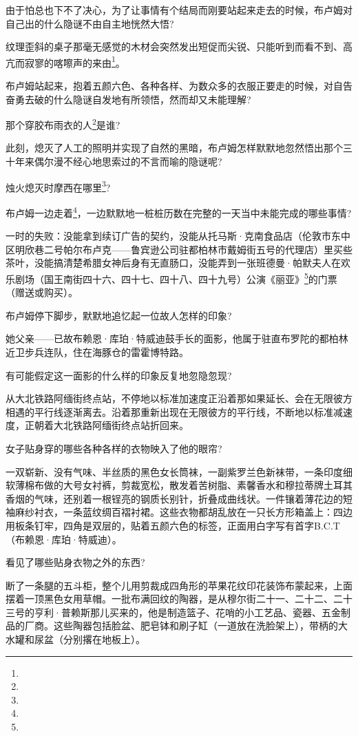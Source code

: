 \par 由于怕总也下不了决心，为了让事情有个结局而刚要站起来走去的时候，布卢姆对自己出的什么隐谜不由自主地恍然大悟?
\par 纹理歪斜的桌子那毫无感觉的木材会突然发出短促而尖锐、只能听到而看不到、高亢而寂寥的喀嚓声的来由\footnote{}。
\par 布卢姆站起来，抱着五颜六色、各种各样、为数众多的衣服正要走的时候，对自告奋勇去破的什么隐谜自发地有所领悟，然而却又未能理解?
\par 那个穿胶布雨衣的人\footnote{}是谁?
\par 此刻，熄灭了人工的照明并实现了自然的黑暗，布卢姆怎样默默地忽然悟出那个三十年来偶尔漫不经心地思索过的不言而喻的隐谜呢?
\par 烛火熄灭时摩西在哪里\footnote{}?
\par 布卢姆一边走着\footnote{}，一边默默地一桩桩历数在完整的一天当中未能完成的哪些事情?
\par 一时的失败：没能拿到续订广告的契约，没能从托马斯·克南食品店（伦敦市东中区明欣巷二号帕尔布卢克——鲁宾逊公司驻都柏林市戴姆街五号的代理店）里买些茶叶，没能搞清楚希腊女神后身有无直肠口，没能弄到一张班德曼·帕默夫人在欢乐剧场（国王南街四十六、四十七、四十八、四十九号）公演《丽亚》\footnote{}的门票（赠送或购买）。
\par 布卢姆停下脚步，默默地追忆起一位故人怎样的印象?
\par 她父亲——已故布赖恩·库珀·特威迪鼓手长的面影，他属于驻直布罗陀的都柏林近卫步兵连队，住在海豚仓的雷霍博特路。
\par 有可能假定这一面影的什么样的印象反复地忽隐忽现?
\par 从大北铁路阿缅街终点站，不停地以标准加速度正沿着那如果延长、会在无限彼方相遇的平行线逐渐离去。沿着那重新出现在无限彼方的平行线，不断地以标准减速度，正朝着大北铁路阿缅街终点站折回来。
\par 女子贴身穿的哪些各种各样的衣物映入了他的眼帘?
\par 一双崭新、没有气味、半丝质的黑色女长筒袜，一副紫罗兰色新袜带，一条印度细软薄棉布做的大号女衬裤，剪裁宽松，散发着苦树脂、素馨香水和穆拉蒂牌土耳其香烟的气味，还别着一根锃亮的钢质长别针，折叠成曲线状。一件镶着薄花边的短袖麻纱衬衣，一条蓝纹绸百褶衬裙。这些衣物都胡乱放在一只长方形箱盖上：四边用板条钉牢，四角是双层的，贴着五颜六色的标签，正面用白字写有首字B.C.T（布赖恩·库珀·特威迪）。
\par 看见了哪些贴身衣物之外的东西?
\par 断了一条腿的五斗柜，整个儿用剪裁成四角形的苹果花纹印花装饰布蒙起来，上面摆着一顶黑色女用草帽。一批布满回纹的陶器，是从穆尔街二十一、二十二、二十三号的亨利·普赖斯那儿买来的，他是制造篮子、花哨的小工艺品、瓷器、五金制品的厂商。这些陶器包括脸盆、肥皂钵和刷子缸（一道放在洗脸架上），带柄的大水罐和尿盆（分别撂在地板上）。
